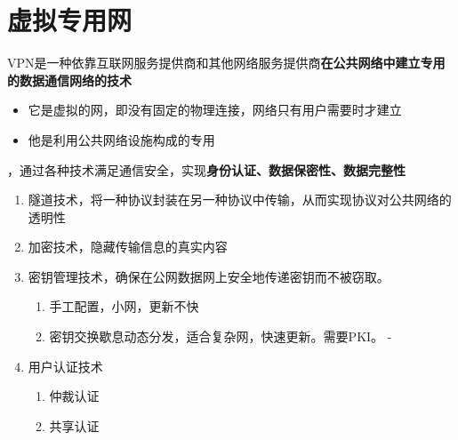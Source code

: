 \chapter{虚拟专用网}
VPN是一种依靠互联网服务提供商和其他网络服务提供商\textbf{在公共网络中建立专用的数据通信网络的技术}
\begin{itemize}
	\item 它是虚拟的网，即没有固定的物理连接，网络只有用户需要时才建立
	\item 他是利用公共网络设施构成的专用
\end{itemize}

，通过各种技术满足通信安全，实现\textbf{身份认证、数据保密性、数据完整性}
\begin{enumerate}
	\item 隧道技术，将一种协议封装在另一种协议中传输，从而实现协议对公共网络的透明性
	\item 加密技术，隐藏传输信息的真实内容
	\item 密钥管理技术，确保在公网数据网上安全地传递密钥而不被窃取。
	\begin{enumerate}
		\item 手工配置，小网，更新不快
		\item 密钥交换歇息动态分发，适合复杂网，快速更新。需要PKI。
-	\end{enumerate}
	\item 用户认证技术
	\begin{enumerate}
		\item 仲裁认证
		\item 共享认证
	\end{enumerate}
\end{enumerate}

